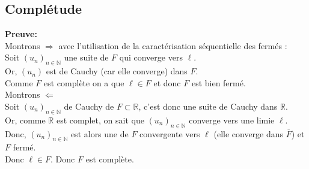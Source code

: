 \documentclass{article}
\begin{document}
\subsection{Complétude}



\noindent\textbf{Preuve:}\\
Montrons $\Rightarrow$ avec l'utilisation de la caractérisation séquentielle des fermés :\\
\indent Soit $(u_n)_{n\in \mathbb{N}}$ une suite de $F$ qui converge vers $\ell$.\\
\indent Or, $(u_n)$ est de Cauchy (car elle converge) dans $F$.\\
\indent Comme $F$ est complète on a que $\ell \in F$ et donc $F$ est bien fermé.\\
Montrons $\Leftarrow$\\
\indent Soit $(u_n)_{n\in \mathbb{N}}$ de Cauchy de $F\subset \mathbb{R}$, c'est donc une suite de Cauchy dans $\mathbb{R}$.\\
\indent Or, comme $\mathbb{R}$ est complet, on sait que $(u_n)_{n\in \mathbb{N}}$ converge vers une limie $\ell$.\\
\indent Donc, $(u_n)_{n\in \mathbb{N}}$ est alors une de $F$ convergente vers $\ell$ (elle converge dans $\overline{F}$) et $F$ fermé.\\
\indent Donc $\ell \in F$. \indent Donc $F$ est complète.
\newpage
\tableofcontents
\end{document}
